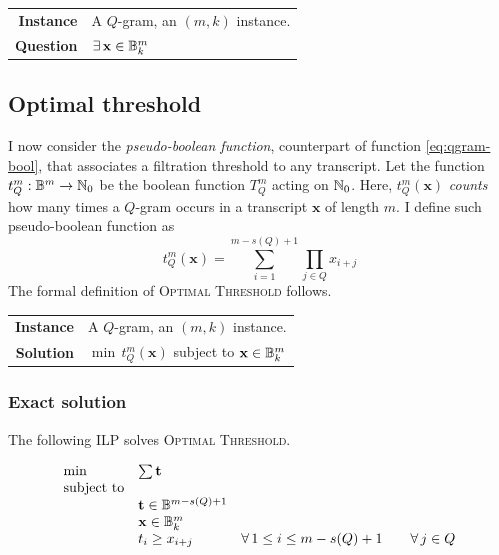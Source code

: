 \begin{problem}
\begin{tabular}{rl}
{\bf Instance}	&	A $Q$-gram, an $(m,k)$ instance. \\
{\bf Question}	&	$\exists \, \mathbf{x} \in \mathbb {B}^m_k$ \st $T_{Q}^{m}(\mathbf{x}) = 0$? \\
\end{tabular}
\end{problem}


\subsection{Optimal threshold}
\label{sub:qgram-optimal-threshold}

I now consider the \emph{pseudo-boolean function}, counterpart of function \ref{eq:qgram-bool}, that associates a filtration threshold to any transcript.
Let the function $t_{Q}^{m}: \mathbb {B}^m \rightarrow \mathbb {N}_0$ be the boolean function $T_{Q}^{m}$ acting on $\mathbb {N}_0$.
Here, $t_{Q}^{m}(\mathbf{x})$ \emph{counts} how many times a $Q$-gram occurs in a transcript $\mathbf{x}$ of length $m$.
I define such pseudo-boolean function as
\begin{equation}
\label{eq:qgram-pseudo}
t_{Q}^{m}(\mathbf{x}) = \sum_{i=1}^{m-s(Q)+1} \prod_{j \in Q} x_{i+j}
\end{equation}
The formal definition of \textsc{Optimal Threshold} follows.

\begin{problem}
\begin{tabular}{rl}
{\bf Instance}	&	A $Q$-gram, an $(m,k)$ instance.\\
{\bf Solution}	&	$\min \, t_{Q}^{m}(\mathbf{x})$ subject to $\mathbf{x} \in \mathbb {B}^m_k$
\end{tabular}
\end{problem}

\subsubsection{Exact solution}

The following ILP solves \textsc{Optimal Threshold}.

\begin{equation}
\begin{array}{lll}
\text{min} & \sum \mathbf{t}					\\
\text{subject to}						\\
& \mathbf{t} \in \mathbb {B}^{m - s(Q) + 1}		\\
& \mathbf{x} \in \mathbb {B}^m_k				\\
& t_i \geq x_{i+j} 						& \forall \, 1 \leq i \leq m-s(Q)+1 \quad \quad \forall \, j \in Q \\
\end{array}
\end{equation}


